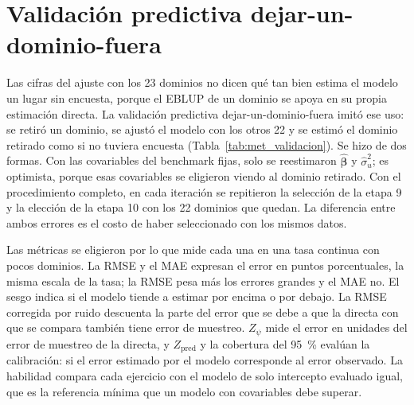 \section{Validación predictiva dejar-un-dominio-fuera}
\label{sec:met_validacion}

Las cifras del ajuste con los 23 dominios no dicen qué tan bien estima el modelo un lugar sin encuesta, porque el EBLUP de un dominio se apoya en su propia estimación directa. La validación predictiva dejar-un-dominio-fuera imitó ese uso: se retiró un dominio, se ajustó el modelo con los otros 22 y se estimó el dominio retirado como si no tuviera encuesta (Tabla~\ref{tab:met_validacion}). Se hizo de dos formas. Con las covariables del benchmark fijas, solo se reestimaron $\hat{\boldsymbol{\beta}}$ y $\hat{\sigma}_u^2$; es optimista, porque esas covariables se eligieron viendo al dominio retirado. Con el procedimiento completo, en cada iteración se repitieron la selección de la etapa 9 y la elección de la etapa 10 con los 22 dominios que quedan. La diferencia entre ambos errores es el costo de haber seleccionado con los mismos datos.

Las métricas se eligieron por lo que mide cada una en una tasa continua con pocos dominios. La RMSE y el MAE expresan el error en puntos porcentuales, la misma escala de la tasa; la RMSE pesa más los errores grandes y el MAE no. El sesgo indica si el modelo tiende a estimar por encima o por debajo. La RMSE corregida por ruido descuenta la parte del error que se debe a que la directa con que se compara también tiene error de muestreo. $Z_\psi$ mide el error en unidades del error de muestreo de la directa, y $Z_{\text{pred}}$ y la cobertura del 95~\% evalúan la calibración: si el error estimado por el modelo corresponde al error observado. La habilidad compara cada ejercicio con el modelo de solo intercepto evaluado igual, que es la referencia mínima que un modelo con covariables debe superar.


